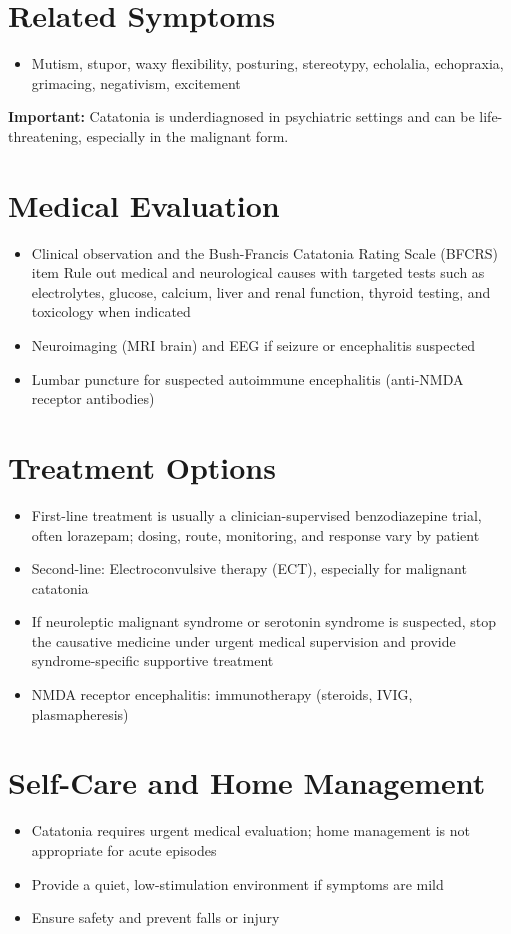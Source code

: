 \section*{Related Symptoms}
\begin{itemize}
 \item Mutism, stupor, waxy flexibility, posturing, stereotypy, echolalia, echopraxia, grimacing, negativism, excitement
\end{itemize}
\textbf{Important:} Catatonia is underdiagnosed in psychiatric settings and can be life-threatening, especially in the malignant form.

\section*{Medical Evaluation}
\begin{itemize}
 \item Clinical observation and the Bush-Francis Catatonia Rating Scale (BFCRS)
\\item Rule out medical and neurological causes with targeted tests such as electrolytes, glucose, calcium, liver and renal function, thyroid testing, and toxicology when indicated
 \item Neuroimaging (MRI brain) and EEG if seizure or encephalitis suspected
 \item Lumbar puncture for suspected autoimmune encephalitis (anti-NMDA receptor antibodies)
\end{itemize}

\section*{Treatment Options}
\begin{itemize}
 \item First-line treatment is usually a clinician-supervised benzodiazepine trial, often lorazepam; dosing, route, monitoring, and response vary by patient
 \item Second-line: Electroconvulsive therapy (ECT), especially for malignant catatonia
 \item If neuroleptic malignant syndrome or serotonin syndrome is suspected, stop the causative medicine under urgent medical supervision and provide syndrome-specific supportive treatment
 \item NMDA receptor encephalitis: immunotherapy (steroids, IVIG, plasmapheresis)
\end{itemize}

\section*{Self-Care and Home Management}
\begin{itemize}
 \item Catatonia requires urgent medical evaluation; home management is not appropriate for acute episodes
 \item Provide a quiet, low-stimulation environment if symptoms are mild
 \item Ensure safety and prevent falls or injury
\end{itemize}

